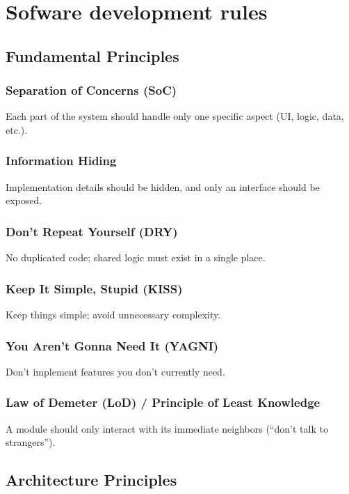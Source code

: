 \chapter{Sofware development rules}
    
\section{Fundamental Principles}
    
    \subsection{Separation of Concerns (SoC)}
        Each part of the system should handle only one specific aspect (UI, logic, data, etc.).
    
    \subsection{Information Hiding}
        Implementation details should be hidden, and only an interface should be exposed.
    
    \subsection{Don’t Repeat Yourself (DRY)}
        No duplicated code; shared logic must exist in a single place.
    
    \subsection{Keep It Simple, Stupid (KISS)}
        Keep things simple; avoid unnecessary complexity.
    
    \subsection{You Aren’t Gonna Need It (YAGNI)}
        Don’t implement features you don’t currently need.
    
    \subsection{Law of Demeter (LoD) / Principle of Least Knowledge}
        A module should only interact with its immediate neighbors (“don’t talk to strangers”).

\section{Architecture Principles}
    
